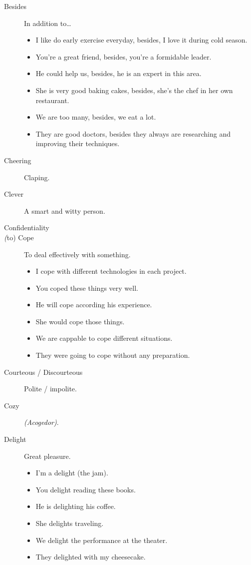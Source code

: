 \begin{multicols}{2}
\begin{description}
\item[Besides] In addition to\dots
\begin{itemize}
\item I like do early exercise everyday, besides, I love it during cold season.
\item You're a great friend, besides, you're a formidable leader.
\item He could help us, besides, he is an expert in this area.
\item She is very good baking cakes, besides, she's the chef in her own restaurant.
\item We are too many, besides, we eat a lot.
\item They are good doctors, besides they always are researching and improving their techniques.
\end{itemize}

\item[Cheering] Claping.

\item[Clever] A smart and witty person.

\item[Confidentiality]

\item[\emph(to) Cope] To deal effectively with something.
\begin{itemize}
\item I cope with different technologies in each project.
\item You coped these things very well.
\item He will cope according his experience.
\item She would cope those things.
\item We are cappable to cope different situations.
\item They were going to cope without any preparation.
\end{itemize}

\item[Courteous / Discourteous] Polite / impolite.

\item[Cozy] \emph{(Acogedor)}.

\item[Delight] Great pleasure.
\begin{itemize}
\item I'm a delight (the jam).
\item You delight reading these books.
\item He is delighting his coffee.
\item She delights traveling.
\item We delight the performance at the theater.
\item They delighted with my cheesecake.
\end{itemize}


\end{description}
\end{multicols}
